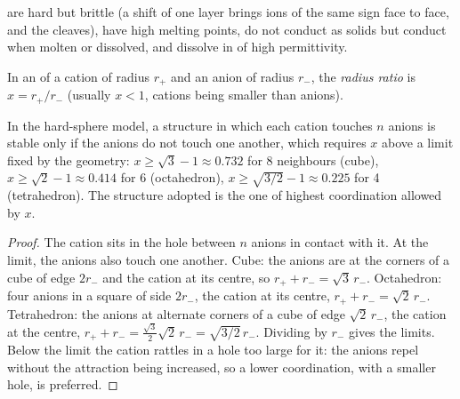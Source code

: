 \begin{proposition}\label{prop:b1:crystals-ionic-covalent:ionic-properties}
 are hard but brittle (a shift of one layer brings ions of
the same sign face to face, and the  cleaves), have high melting
points, do not conduct as solids but conduct when molten or dissolved,
and dissolve in  of high permittivity.
\end{proposition}
\admitted

\begin{definition}\label{def:b1:crystals-ionic-covalent:radius-ratio}
In an  of a cation of radius $r_+$ and an anion of radius
$r_-$, the \emph{radius ratio} is $x = r_+/r_-$
(usually $x < 1$, cations being smaller than anions).
\end{definition}

\begin{proposition}\label{prop:b1:crystals-ionic-covalent:rule}
In the hard-sphere model, a structure in which each cation touches $n$
anions is stable only if the anions do not touch one another, which
requires $x$ above a limit fixed by the geometry: $x \ge \sqrt3 - 1
\approx 0.732$ for 8 neighbours (cube), $x \ge \sqrt2 - 1 \approx 0.414$
for 6 (octahedron), $x \ge \sqrt{3/2} - 1 \approx 0.225$ for 4
(tetrahedron). The structure adopted is the one of highest coordination
allowed by $x$.
\end{proposition}

\begin{proof}
The cation sits in the hole between $n$ anions in contact with it. At the
limit, the anions also touch one another. Cube: the anions are at the
corners of a cube of edge $2r_-$ and the cation at its centre, so $r_+ +
r_- = \sqrt3\,r_-$. Octahedron: four anions in a square of side $2r_-$,
the cation at its centre, $r_+ + r_- = \sqrt2\,r_-$. Tetrahedron: the
anions at alternate corners of a cube of edge $\sqrt2\,r_-$, the cation at
the centre, $r_+ + r_- = \frac{\sqrt3}{2}\sqrt2\,r_- = \sqrt{3/2}\,r_-$.
Dividing by $r_-$ gives the limits. Below the limit the cation rattles in
a hole too large for it: the anions repel without the attraction being
increased, so a lower coordination, with a smaller hole, is preferred.
\end{proof}

